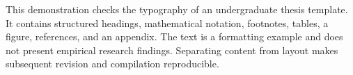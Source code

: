 This demonstration checks the typography of an undergraduate thesis template. It contains structured headings, mathematical notation, footnotes, tables, a figure, references, and an appendix. The text is a formatting example and does not present empirical research findings. Separating content from layout makes subsequent revision and compilation reproducible.
